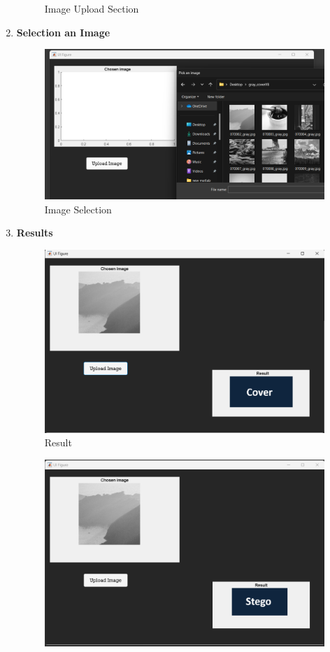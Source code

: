\begin{enumerate}
\begin{figure}[H]
    \caption{Image Upload Section}
\end{figure}
\item \Large \textbf{Selection an Image}
\begin{figure}[H]
    \centering
    \includegraphics[width=140mm]{./img/selectsample.png}
    \caption{Image Selection}
\end{figure}
\clearpage 
\item \Large \textbf{Results}
\begin{figure}[H]
    \centering
    \includegraphics[width=140mm]{./img/resultGrayCover.png}
    \caption{Result}
\end{figure}
\begin{figure}[H]
    \centering
    \includegraphics[width=140mm]{./img/resultGrayStego.png}

\end{figure}
\end{enumerate}

